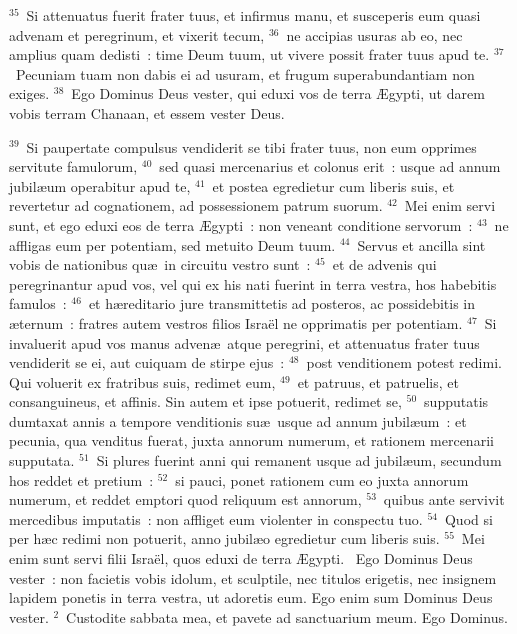 ${}^{35}$~Si attenuatus fuerit frater tuus, et infirmus manu, et susceperis eum quasi advenam et peregrinum, et vixerit tecum,
${}^{36}$~ne accipias usuras ab eo, nec amplius quam dedisti~: time Deum tuum, ut vivere possit frater tuus apud te.
${}^{37}$~Pecuniam tuam non dabis ei ad usuram, et frugum superabundantiam non exiges.
${}^{38}$~Ego Dominus Deus vester, qui eduxi vos de terra \AE gypti, ut darem vobis terram Chanaan, et essem vester Deus.


${}^{39}$~Si paupertate compulsus vendiderit se tibi frater tuus, non eum opprimes servitute famulorum,
${}^{40}$~sed quasi mercenarius et colonus erit~: usque ad annum jubil\ae um operabitur apud te,
${}^{41}$~et postea egredietur cum liberis suis, et revertetur ad cognationem, ad possessionem patrum suorum.
${}^{42}$~Mei enim servi sunt, et ego eduxi eos de terra \AE gypti~: non veneant conditione servorum~:
${}^{43}$~ne affligas eum per potentiam, sed metuito Deum tuum.
${}^{44}$~Servus et ancilla sint vobis de nationibus qu\ae\ in circuitu vestro sunt~:
${}^{45}$~et de advenis qui peregrinantur apud vos, vel qui ex his nati fuerint in terra vestra, hos habebitis famulos~:
${}^{46}$~et h\ae reditario jure transmittetis ad posteros, ac possidebitis in \ae ternum~: fratres autem vestros filios Isra\"el ne opprimatis per potentiam.
${}^{47}$~Si invaluerit apud vos manus adven\ae\ atque peregrini, et attenuatus frater tuus vendiderit se ei, aut cuiquam de stirpe ejus~:
${}^{48}$~post venditionem potest redimi. Qui voluerit ex fratribus suis, redimet eum,
${}^{49}$~et patruus, et patruelis, et consanguineus, et affinis. Sin autem et ipse potuerit, redimet se,
${}^{50}$~supputatis dumtaxat annis a tempore venditionis su\ae\ usque ad annum jubil\ae um~: et pecunia, qua venditus fuerat, juxta annorum numerum, et rationem mercenarii supputata.
${}^{51}$~Si plures fuerint anni qui remanent usque ad jubil\ae um, secundum hos reddet et pretium~:
${}^{52}$~si pauci, ponet rationem cum eo juxta annorum numerum, et reddet emptori quod reliquum est annorum,
${}^{53}$~quibus ante servivit mercedibus imputatis~: non affliget eum violenter in conspectu tuo.
${}^{54}$~Quod si per h\ae c redimi non potuerit, anno jubil\ae o egredietur cum liberis suis.
${}^{55}$~Mei enim sunt servi filii Isra\"el, quos eduxi de terra \AE gypti.
~Ego Dominus Deus vester~: non facietis vobis idolum, et sculptile, nec titulos erigetis, nec insignem lapidem ponetis in terra vestra, ut adoretis eum. Ego enim sum Dominus Deus vester.
${}^{2}$~Custodite sabbata mea, et pavete ad sanctuarium meum. Ego Dominus.

